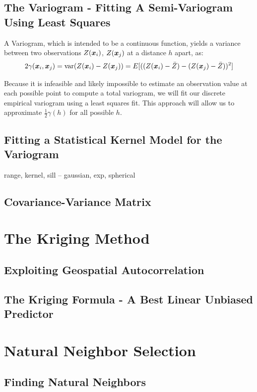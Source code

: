 \documentclass[11pt]{ucthesis}
\newcommand{\vect}[1]{{\it{\boldsymbol{#1}}}}
\begin{document}
\subsection{The Variogram - Fitting A Semi-Variogram Using Least Squares}
A Variogram, which is intended to be a continuous function, yields a variance between two observations $Z(\vect{x}_{i})$, $Z(\vect{x}_{j})$ at a distance $h$ apart, as:
\begin{equation}
	2\gamma(\vect{x}_i, \vect{x}_j)= \text{var} (Z(\vect{x}_{i}) - Z(\vect{x}_{j}))=E[( (Z(\vect{x}_{i}) - \bar{Z} ) - (Z(\vect{x}_{j}) - \bar{Z} ))^2]
\end{equation}

Because it is infeasible and likely impossible to estimate an observation value at each possible point to compute a total variogram, we will fit our discrete empirical variogram using a least squares fit. This approach will allow us to approximate $\frac{1}{2}\gamma(h)$ for all possible $h$.
\subsection{Fitting a Statistical Kernel Model for the Variogram}
range, kernel, sill -- gaussian, exp, spherical
\subsection{Covariance-Variance Matrix}

\section{The Kriging Method}
\subsection{Exploiting Geospatial Autocorrelation}
\subsection{The Kriging Formula - A Best Linear Unbiased Predictor}

\section{Natural Neighbor Selection}
\subsection{Finding Natural Neighbors}
\end{document}
